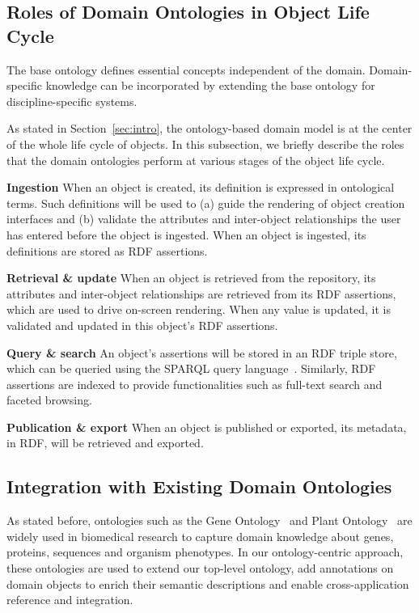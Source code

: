 \documentclass[conference,10pt]{IEEEtran}
\begin{document}
\vspace{-8pt}
\subsection{Roles of Domain Ontologies in Object Life Cycle}
The base ontology defines essential concepts independent of the domain. Domain-specific knowledge can be incorporated by extending the base ontology for discipline-specific systems.

As stated in Section~\ref{sec:intro}, the ontology-based domain model is at the center of the whole life cycle of objects. In this subsection, we briefly describe the roles that the domain ontologies perform at various stages of the object life cycle.

\begin{list}{}{\leftmargin=1em}
\item[\textbf{Ingestion}] When an object is created, its definition is expressed in ontological terms. Such definitions will be used to (a) guide the rendering of object creation interfaces and (b) validate the attributes and inter-object relationships the user has entered before the object is ingested. When an object is ingested, its definitions are stored as RDF assertions.

\item[\textbf{Retrieval \& update}] When an object is retrieved from the repository, its attributes and inter-object relationships are retrieved from its RDF assertions, which are used to drive on-screen rendering. When any value is updated, it is validated and updated in this object's RDF assertions.

\item[\textbf{Query \& search}] An object's assertions will be stored in an RDF triple store, which can be queried using the SPARQL query language~\cite{sparql}. Similarly, RDF assertions are indexed to provide functionalities such as full-text search and faceted browsing. 

\item[\textbf{Publication \& export}] When an object is published or exported, its metadata, in RDF, will be retrieved and exported.
\end{list}

\subsection{Integration with Existing Domain Ontologies}
As stated before, ontologies such as the Gene Ontology~\cite{citeulike:212874} and Plant Ontology~\cite{citeulike:3008167} are widely used in biomedical research to capture domain knowledge about genes, proteins, sequences and organism phenotypes. In our ontology-centric approach, these ontologies are used to extend our top-level ontology, add annotations on domain objects to enrich their semantic descriptions and enable cross-application reference and integration.
\end{document}

